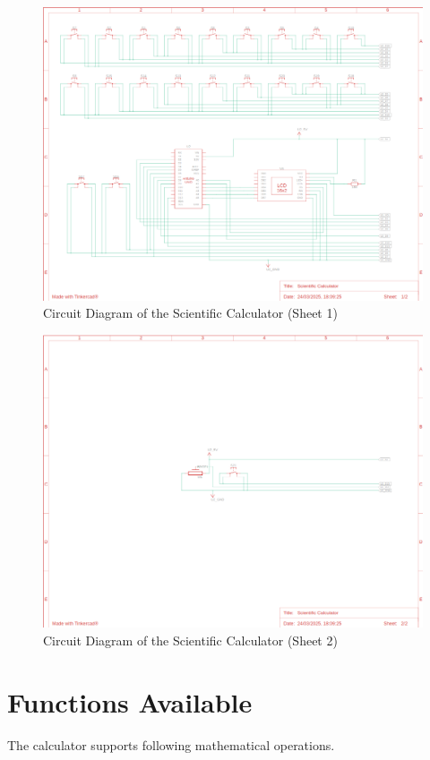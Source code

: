 \documentclass[a4paper,12pt]{article}
\begin{document}
\begin{figure}[H]
    \centering
    \includegraphics[width=\textwidth]{figs/circuit1.png}
    \caption{Circuit Diagram of the Scientific Calculator (Sheet 1)}
    \label{fig:circuit1}
\end{figure}

\begin{figure}[H]
    \centering
    \includegraphics[width=\textwidth]{figs/circuit2.png}
    \caption{Circuit Diagram of the Scientific Calculator (Sheet 2)}
    \label{fig:circuit2}
\end{figure}

\section{Functions Available}
The calculator supports following mathematical operations.
\end{document}
